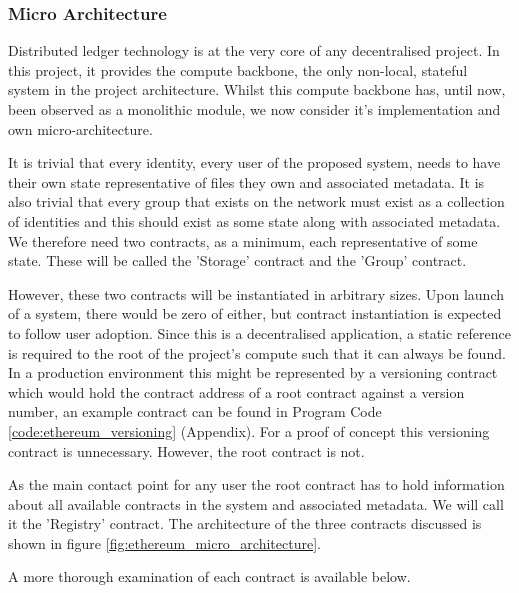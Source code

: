\subsubsection{Micro Architecture}

Distributed ledger technology is at the very core of any decentralised project. In this project, it provides the compute backbone, the only non-local, stateful system in the project architecture. Whilst this compute backbone has, until now, been observed as a monolithic module, we now consider it's implementation and own micro-architecture.

It is trivial that every identity, every user of the proposed system, needs to have their own state representative of files they own and associated metadata. It is also trivial that every group that exists on the network must exist as a collection of identities and this should exist as some state along with associated metadata. We therefore need two contracts, as a minimum, each representative of some state. These will be called the 'Storage' contract and the 'Group' contract.

However, these two contracts will be instantiated in arbitrary sizes. Upon launch of a system, there would be zero of either, but contract instantiation is expected to follow user adoption. Since this is a decentralised application, a static reference is required to the root of the project's compute such that it can always be found. In a production environment this might be represented by a versioning contract which would hold the contract address of a root contract against a version number, an example contract can be found in Program Code \ref{code:ethereum_versioning} (Appendix). For a proof of concept this versioning contract is unnecessary. However, the root contract is not.

As the main contact point for any user the root contract has to hold information about all available contracts in the system and associated metadata. We will call it the 'Registry' contract. The architecture of the three contracts discussed is shown in figure \ref{fig:ethereum_micro_architecture}.



A more thorough examination of each contract is available below.

